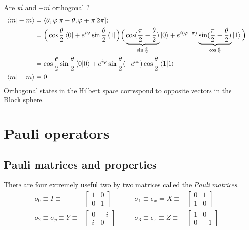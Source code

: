 \documentclass{article}
\begin{document}
Are $\vec{m}$ and $\vec{-m}$ orthogonal ?
\begin{equation}
    \label{m-m-orthogonal}
    \begin{aligned} %
        \braket{m|-m}
            & = \braket{\theta,\varphi|\pi-\theta,\varphi+\pi[2\pi]} \\
            & = \Big(\cos\frac{\theta}{2}\bra{0}+e^{i\varphi}\sin\frac{\theta}{2}\bra{1}\Big)
                \Big(\underbrace{\cos(\frac{\pi}{2}-\frac{\theta}{2})}_{\sin\frac{\theta}{2}}
                \ket{0}+e^{i(\varphi+\pi)}
                \underbrace{\sin(\frac{\pi}{2}-\frac{\theta}{2})}_{
                \cos\frac{\theta}{2}}\ket{1}\Big) \\
            & = \cos\frac{\theta}{2}\sin\frac{\theta}{2}\braket{0|0}
                +e^{i\varphi}\sin\frac{\theta}{2}(-e^{i\varphi})\cos\frac{\theta}{2}\braket{1|1} \\
        \braket{m|-m}
            & = 0
    \end{aligned}
\end{equation}
Orthogonal states in the Hilbert space correspond to opposite vectors in the
Bloch sphere.


\section{Pauli operators}
\subsection{Pauli matrices and properties}
There are four extremely useful two by two matrices called the \textit{Pauli
matrices}.
$$
\begin{aligned}
    \sigma_0 \equiv I \equiv &
        \begin{bmatrix}
            1 & 0 \\ 0 & 1
        \end{bmatrix}
    \quad & \quad
    \sigma_1 \equiv \sigma_x = X \equiv &
        \begin{bmatrix}
            0 & 1 \\ 1 & 0
        \end{bmatrix}
    \\
    \sigma_2 \equiv \sigma_y \equiv Y \equiv &
        \begin{bmatrix}
            0 & -i \\ i & 0
        \end{bmatrix}
    \quad & \quad
    \sigma_3 \equiv \sigma_z \equiv Z \equiv &
        \begin{bmatrix}
            1 & 0 \\ 0 & -1
        \end{bmatrix}
\end{aligned}
$$
\end{document}
